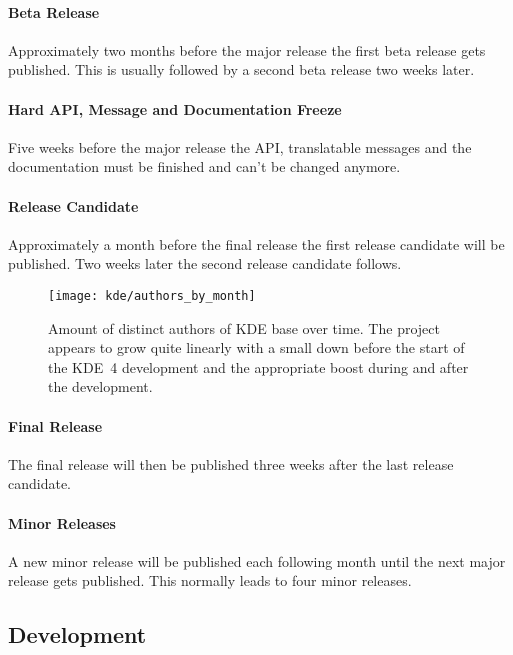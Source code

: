 \paragraph{Beta Release}

Approximately two months before the major release the first beta release gets
published. This is usually followed by a second beta release two weeks later.

\paragraph{Hard API, Message and Documentation Freeze}

Five weeks before the major release the \ac{API}, translatable messages and the
documentation must be finished and can't be changed anymore.

\paragraph{Release Candidate}

Approximately a month before the final release the first release candidate will
be published. Two weeks later the second release candidate follows.

\begin{figure}[htbp]
  \centering
  \texttt{[image: kde/authors\_by\_month]}
  \caption{Amount of distinct authors of KDE base over time. The project
  appears to grow quite linearly with a small down before the start of the
  KDE~4 development and the appropriate boost during and after the development.}
\end{figure}

\paragraph{Final Release}

The final release will then be published three weeks after the last release
candidate.

\paragraph{Minor Releases}

A new minor release will be published each following month until the next major
release gets published. This normally leads to four minor releases.


\subsection{Development} %

